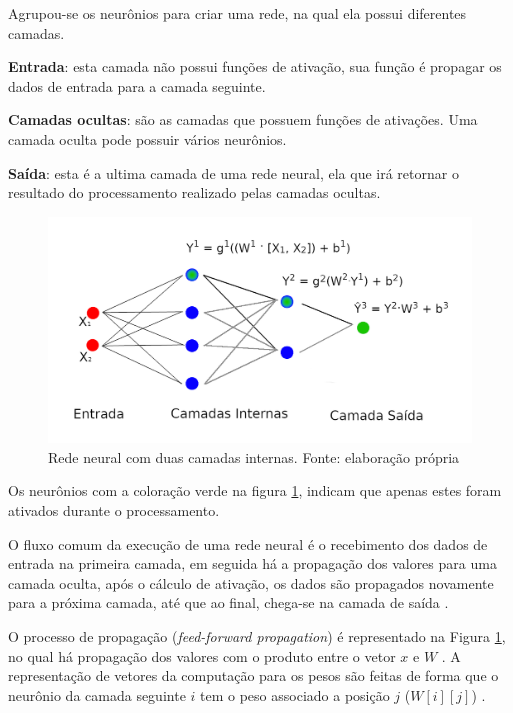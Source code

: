 Agrupou-se os neurônios para criar uma rede, na qual ela possui diferentes camadas.

\begin{description}
	\item \textbf{Entrada}: esta camada não possui funções de ativação, sua função é propagar os dados de entrada para a camada seguinte.
    \item \textbf{Camadas ocultas}: são as camadas que possuem funções de ativações. Uma camada oculta pode possuir vários neurônios.
    \item \textbf{Saída}: esta é a ultima camada de uma rede neural, ela que irá retornar o resultado do processamento realizado pelas camadas ocultas.
\end{description}

\begin{figure}[h]
	\centering
    \includegraphics[keepaspectratio=true,scale=1.3]{figuras/redeNeural}
	\caption[Rede Neural Simples]{Rede neural com duas camadas internas. Fonte: elaboração própria}
	\label{fig:redeNeural}
\end{figure}

Os neurônios com a coloração verde na figura \ref{fig:redeNeural}, indicam que apenas estes foram ativados durante o processamento.
 
O fluxo comum da execução de uma rede neural é o recebimento dos dados de entrada na primeira camada, em seguida há a propagação dos valores para uma camada oculta, após o cálculo de ativação, os dados são propagados novamente para a próxima camada, até que ao final, chega-se na camada de saída \cite{GOLDBERG2017}.

O processo de propagação (\textit{feed-forward propagation}) é representado na Figura \ref{fig:redeNeural}, no qual há propagação dos valores com o produto entre o vetor $x$ e $W$ \cite{GOLDBERG2017}. A representação de vetores da computação para os pesos são feitas de forma que o neurônio da camada seguinte $i$ tem o peso associado a posição $j$ ($W[i][j]$) \cite{NIELSEN2015}.

